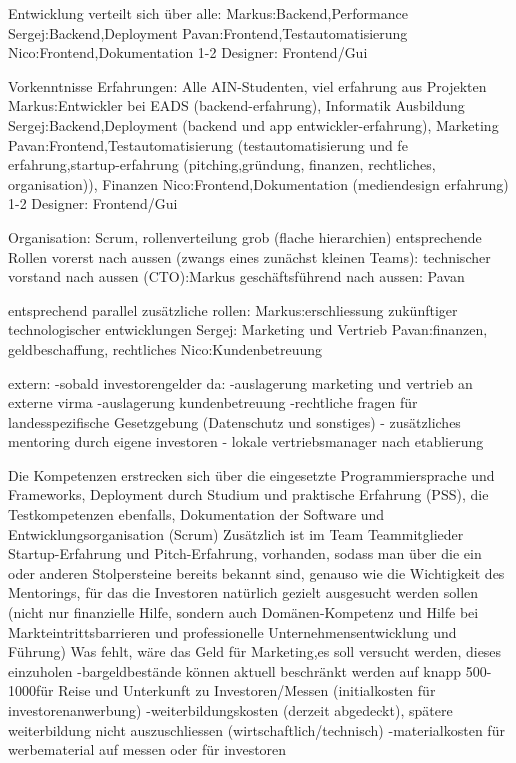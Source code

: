  Entwicklung verteilt sich über alle:
 Markus:Backend,Performance
 Sergej:Backend,Deployment
 Pavan:Frontend,Testautomatisierung
 Nico:Frontend,Dokumentation
 1-2 Designer: Frontend/Gui
 
 Vorkenntnisse Erfahrungen: Alle AIN-Studenten, viel erfahrung aus Projekten
 Markus:Entwickler bei EADS (backend-erfahrung), Informatik Ausbildung
 Sergej:Backend,Deployment (backend und app entwickler-erfahrung), Marketing
 Pavan:Frontend,Testautomatisierung (testautomatisierung und fe erfahrung,startup-erfahrung (pitching,gründung, finanzen, rechtliches, organisation)), Finanzen
 Nico:Frontend,Dokumentation (mediendesign erfahrung)
 1-2 Designer: Frontend/Gui
 
 Organisation: Scrum, rollenverteilung grob (flache hierarchien)
 entsprechende Rollen vorerst nach aussen (zwangs eines zunächst kleinen Teams):
 technischer vorstand nach aussen (CTO):Markus
 geschäftsführend nach aussen: Pavan 
 
 entsprechend parallel zusätzliche rollen:
 Markus:erschliessung zukünftiger technologischer entwicklungen
 Sergej: Marketing und Vertrieb
 Pavan:finanzen, geldbeschaffung, rechtliches
 Nico:Kundenbetreuung
 
 extern:
 -sobald investorengelder da:
 -auslagerung marketing und vertrieb an externe virma
 -auslagerung kundenbetreuung
 -rechtliche fragen für landesspezifische Gesetzgebung (Datenschutz und sonstiges)
 - zusätzliches mentoring durch eigene investoren
 - lokale vertriebsmanager nach etablierung
 
 
 Die Kompetenzen erstrecken sich über die eingesetzte Programmiersprache und Frameworks, Deployment durch Studium und praktische Erfahrung (PSS),
 die Testkompetenzen ebenfalls, Dokumentation der Software und Entwicklungsorganisation (Scrum)
 Zusätzlich ist im Team Teammitglieder Startup-Erfahrung und Pitch-Erfahrung, vorhanden, sodass man über die ein oder anderen Stolpersteine bereits bekannt sind, genauso
 wie die Wichtigkeit des Mentorings, für das die Investoren natürlich gezielt ausgesucht werden sollen (nicht nur finanzielle Hilfe, sondern auch Domänen-Kompetenz und Hilfe bei Markteintrittsbarrieren
 und professionelle Unternehmensentwicklung und Führung)
 Was fehlt, wäre das Geld für Marketing,es soll versucht werden, dieses einzuholen
 -bargeldbestände können aktuell beschränkt werden auf knapp 500-1000\texteuro für Reise und Unterkunft zu Investoren/Messen (initialkosten für investorenanwerbung)
 -weiterbildungskosten (derzeit abgedeckt), spätere weiterbildung nicht auszuschliessen (wirtschaftlich/technisch)
 -materialkosten für werbematerial auf messen oder für investoren
 
